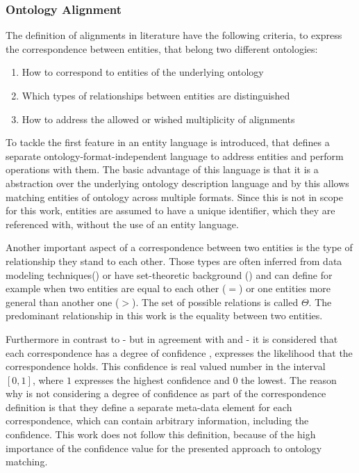 \documentclass[11pt,titlepage,oneside,openany,a4paper]{report}
\begin{document}
\subsubsection{Ontology Alignment}
\label{sec:oa_def}
The definition of alignments in literature have the following criteria, to express the correspondence between entities, that belong two different ontologies:
\begin{enumerate}
\item How to correspond to entities of the underlying ontology
\item Which types of relationships between entities are distinguished
\item How to address the allowed or wished multiplicity of alignments
\end{enumerate}

To tackle the first feature in \cite{euzenat2013d} an entity language is introduced, that defines a separate ontology-format-independent language to address entities and perform operations with them. The basic advantage of this language is that it is a abstraction over the underlying ontology description language and by this allows matching entities of ontology across multiple formats. Since this is not in scope for this work, entities are assumed to have a unique identifier, which they are referenced with, without the use of an entity language.

Another important aspect of a correspondence between two entities is the type of relationship they stand to each other. Those types are often inferred from data modeling techniques(\cite{Rahm:2001}) or have set-theoretic background (\cite{euzenat2013d}) and can define for example when two entities are equal to each other ($=$) or one entities more general than another one ($>$). The set of possible relations is called $\Theta$. The predominant relationship in this work is the equality between two entities.

Furthermore  in contrast to  \cite{euzenat2013d} - but in agreement with \cite{ehrig2006ontology} and \cite{Rahm:2001}- it is considered that each correspondence has a degree of confidence , expresses the likelihood that the correspondence holds. This confidence is real valued number in the interval $[0,1]$, where $1$ expresses the highest confidence and $0$ the lowest. The reason why \cite{euzenat2013d} is not considering a degree of confidence as part of the correspondence definition is that they define a separate meta-data element for each correspondence, which can contain arbitrary information, including the confidence. This work does not follow this definition, because of the high importance of the confidence value for the presented approach to ontology matching.
\end{document}
